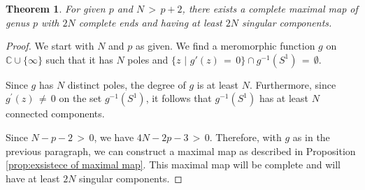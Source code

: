 \documentclass[10pt,a4paper]{amsart}
\newtheorem{theorem}{Theorem}
\begin{document}
\begin{theorem}\label{thm:genus,singularity}
For given \( p \) and \( N \,>\, p + 2 \), there exists a complete maximal map of genus \( p \) with \( 2N \) complete ends and having at least \( 2N \) singular components.
\end{theorem}

\begin{proof}
We start with \( N \) and \( p \) as given. We find a meromorphic function \( g \) on \(\mathbb{C} \cup \{\infty\}\) such that it
has \( N \) poles and \(\{z \,\,\big\vert\,\, g'(z)\, =\, 0\} \cap g^{-1}(S^1) \,=\, \emptyset\).

Since \( g \) has \( N \) distinct poles, the degree of \( g \) is at least \( N \). Furthermore, since $g^\prime(z)\,\neq\, 0$ on the
set $g^{-1}(S^1)$, it follows that  \( g^{-1}(S^1) \) has at least \( N \) connected components.

Since \( N-p-2\,>\,0\), we have $4N-2p-3\,>\,0$. Therefore, with $g$ as in the previous paragraph, we can construct a maximal map as
described in Proposition \ref{prop:exsistece of maximal map}. This maximal map will be complete and will have at least \( 2N \)
singular components.
\end{proof}
\end{document}
